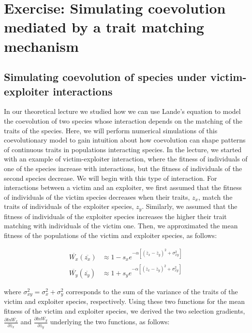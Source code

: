 \documentclass[
]{book}
\begin{document}
\hypertarget{exercise-simulating-coevolution-mediated-by-a-trait-matching-mechanism}{%
\chapter{Exercise: Simulating coevolution mediated by a trait matching mechanism}\label{exercise-simulating-coevolution-mediated-by-a-trait-matching-mechanism}}

\hypertarget{simulating-coevolution-of-species-under-victim-exploiter-interactions}{%
\section{Simulating coevolution of species under victim-exploiter interactions}\label{simulating-coevolution-of-species-under-victim-exploiter-interactions}}

In our theoretical lecture we studied how we can use Lande's equation to model the coevolution of two species whose interaction depends on the matching of the traits of the species. Here, we will perform numerical simulations of this coevolutionary model to gain intuition about how coevolution can shape patterns of continuous traits in populations interacting species. In the lecture, we started with an example of victim-exploiter interaction, where the fitness of individuals of one of the species increase with interactions, but the fitness of individuals of the second species decrease. We will begin with this type of interaction. For interactions between a victim and an exploiter, we first assumed that the fitness of individuals of the victim species decreases when their traits, \(z_x\), match the traits of individuals of the exploiter species, \(z_y\). Similarly, we assumed that the fitness of individuals of the exploiter species increases the higher their trait matching with individuals of the victim one. Then, we approximated the mean fitness of the populations of the victim and exploiter species, as follows:

\[\begin{aligned}
\overline{W_x}(\overline{z_{x}}) &\approx 1-s_{x}e^{-\alpha[(\overline{z}_x-\overline{z}_y)^2+\sigma^2_{xy}]} \\
\overline{W_y}(\overline{z_{y}}) &\approx 1+s_{y}e^{-\alpha[(\overline{z}_x-\overline{z}_y)^2+\sigma^2_{xy}]}
\end{aligned}\]

where \(\sigma^2_{xy}=\sigma^2_{x}+\sigma^2_{y}\) corresponds to the sum of the variance of the traits of the victim and exploiter species, respectively. Using these two functions for the mean fitness of the victim and exploiter species, we derived the two selection gradients, \(\frac{\partial ln\overline{W_x}}{\partial \overline{z}_x}\) and \(\frac{\partial ln\overline{W_y}}{\partial \overline{z}_y}\) underlying the two functions, as follows:
\end{document}
